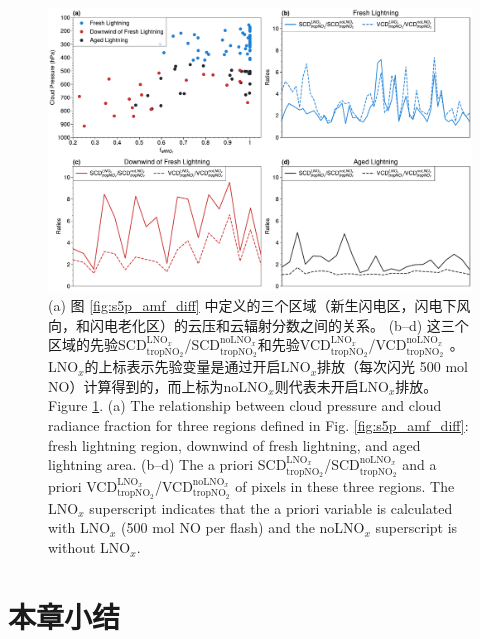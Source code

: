 \begin{figure}[htbp]
    \centering
    \includegraphics[width=14cm]{./figures/amf_contribution.pdf}
    \caption{
    (a) 图 \ref{fig:s5p_amf_diff} 中定义的三个区域（新生闪电区，闪电下风向，和闪电老化区）的云压和云辐射分数之间的关系。
     (b--d) 这三个区域的先验SCD$^{\textrm{LNO$_x$}}_{\textrm{tropNO$_2$}}$/SCD$^{\textrm{noLNO$_x$}}_{ \textrm{tropNO$_2$}}$和先验VCD$^{\textrm{LNO$_x$}}_{\textrm{tropNO$_2$}}$/VCD$^{\textrm{noLNO$_x$ }}_{\textrm{tropNO$_2$}}$。
     LNO$_x$的上标表示先验变量是通过开启LNO$_x$排放（每次闪光 500 mol NO）计算得到的，而上标为noLNO$_x$则代表未开启LNO$_x$排放。\\
     Figure \ref{fig:amf_contribution}. (a) The relationship between cloud pressure and cloud radiance fraction for three regions defined in Fig. \ref{fig:s5p_amf_diff}: fresh lightning region, downwind of fresh lightning, and aged lightning area.
    (b--d) The a priori SCD$^{\textrm{LNO$_x$}}_{\textrm{tropNO$_2$}}$/SCD$^{\textrm{noLNO$_x$}}_{\textrm{tropNO$_2$}}$ and a priori VCD$^{\textrm{LNO$_x$}}_{\textrm{tropNO$_2$}}$/VCD$^{\textrm{noLNO$_x$}}_{\textrm{tropNO$_2$}}$ of pixels in these three regions. The LNO$_x$ superscript indicates that the a priori variable is calculated with LNO$_x$ (500 mol NO per flash) and the noLNO$_x$ superscript is without LNO$_x$.
    }
    \label{fig:amf_contribution}
\end{figure}


\section{本章小结}
